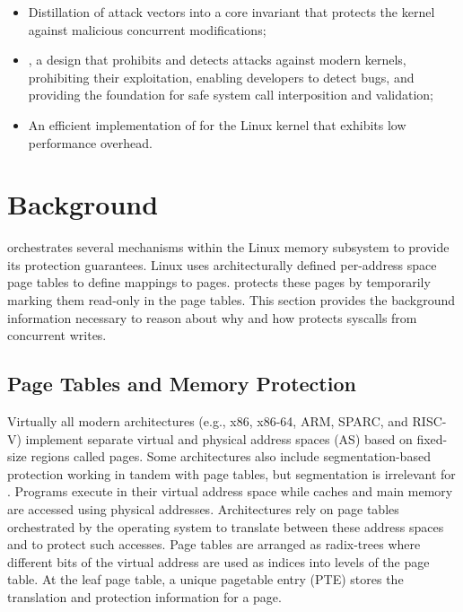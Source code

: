 \documentclass[letterpaper,twocolumn,10pt, anonymous]{article}
\begin{document}
\begin{itemize}[noitemsep]
\item Distillation of \tocttou attack vectors into a core invariant that protects
the kernel against malicious concurrent modifications;
\item \tiktok, a design that prohibits and detects
\tocttou attacks against modern kernels, prohibiting their exploitation,
enabling developers to detect \tocttou bugs, and providing the foundation for
safe system call interposition and validation;
\item An efficient implementation of \tiktok for the Linux kernel that exhibits
low performance overhead.
\end{itemize}


\section{Background}

\tiktok orchestrates several mechanisms within the Linux memory subsystem 
to provide its protection guarantees.
Linux uses architecturally defined per-address space page tables to define
mappings to pages.
\tiktok protects these pages by temporarily marking them read-only in the 
page tables.
This section provides the background information necessary to reason about 
why and how \tiktok protects syscalls from concurrent writes.


\subsection{Page Tables and Memory Protection}

Virtually all modern architectures (e.g., x86, x86-64, ARM, SPARC, and 
RISC-V) implement separate virtual and physical
address spaces (AS) based on fixed-size regions called pages.
%
Some architectures also include segmentation-based protection 
working in tandem with page tables, but segmentation is irrelevant for \tiktok.
%
Programs execute in their virtual address space while caches and main memory
are accessed using physical addresses.
Architectures rely on page tables orchestrated by the operating system 
to translate between these address spaces and to protect such accesses.
Page tables are arranged as radix-trees where different bits of the 
virtual address are used as indices into levels of the page table.
At the leaf page table, a unique pagetable entry (PTE) stores the 
translation and protection information for a page.
\end{document}
